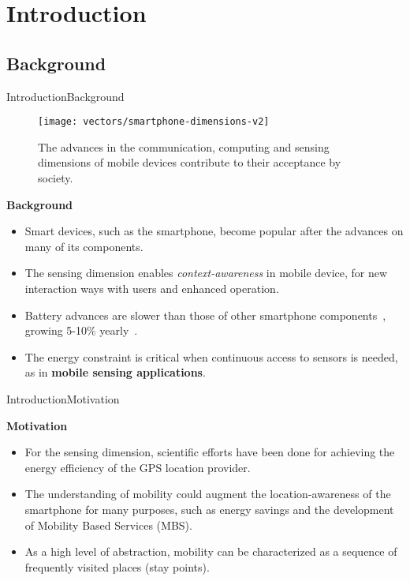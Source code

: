 \section{Introduction}
\subsection{Background}
\begin{frame}{Introduction}{Background}
\small
\begin{figure}[tb]
  \centering
  \texttt{[image: vectors/smartphone-dimensions-v2]}
  \caption{The advances in the communication, computing and sensing dimensions of mobile devices contribute to their acceptance by society.}  
\end{figure}

\begin{block}{\small \textbf{Background}}
\begin{itemize}
	\item Smart devices, such as the smartphone, become popular after the advances on many of its components.
	\item The sensing dimension enables \emph{context-awareness} in mobile device, for new interaction ways with users and enhanced operation.
	\item Battery advances are slower than those of other smartphone components~\cite{Kjaergaard2012}, growing 5-10\% yearly~\cite{Ma2012,Evarts2015}.
	\item The energy constraint is critical when continuous access to sensors is needed, as in \textbf{mobile sensing applications}.
\end{itemize}
\end{block}
\end{frame}

\begin{frame}{Introduction}{Motivation}
\small
\begin{block}{\small \textbf{Motivation}}
\begin{itemize}
	\item For the sensing dimension, scientific efforts have been done for achieving the energy efficiency of the GPS location provider.
	\item The understanding of mobility could augment the location-awareness of the smartphone for many purposes, such as energy savings and the development of Mobility Based Services (MBS).
	\item As a high level of abstraction, mobility can be characterized as a sequence of frequently visited places (stay points).
\end{itemize}
\end{block}
\end{frame}